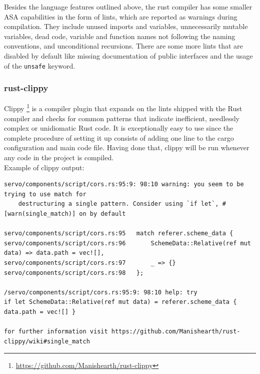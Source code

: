 \documentclass{scrartcl}
\begin{document}
Besides the language features outlined above, the rust compiler has some smaller ASA capabilities in the form of lints, which are reported as warnings during compilation. They include unused imports and variables, unnecessarily mutable variables, dead code, variable and function names not following the naming conventions, and unconditional recursions. There are some more lints that are disabled by default like missing documentation of public interfaces and the usage of the \texttt{unsafe} keyword.

\subsubsection{rust-clippy} \label{clippy}

Clippy \footnote{\url{https://github.com/Manishearth/rust-clippy}} is a compiler plugin that expands on the lints shipped with the Rust compiler and checks for common patterns that indicate inefficient, needlessly complex or unidiomatic Rust code. It is exceptionally easy to use since the complete procedure of setting it up consists of adding one line to the cargo configuration and main code file. Having done that, clippy will be run whenever any code in the project is compiled.\\
\newpage
Example of clippy output:
{
\scriptsize
\begin{verbatim}
servo/components/script/cors.rs:95:9: 98:10 warning: you seem to be trying to use match for
    destructuring a single pattern. Consider using `if let`, #[warn(single_match)] on by default
    
servo/components/script/cors.rs:95   match referer.scheme_data {
servo/components/script/cors.rs:96       SchemeData::Relative(ref mut data) => data.path = vec![],
servo/components/script/cors.rs:97       _ => {}
servo/components/script/cors.rs:98   };

/servo/components/script/cors.rs:95:9: 98:10 help: try
if let SchemeData::Relative(ref mut data) = referer.scheme_data { data.path = vec![] }

for further information visit https://github.com/Manishearth/rust-clippy/wiki#single_match
\end{verbatim}
}
\end{document}
